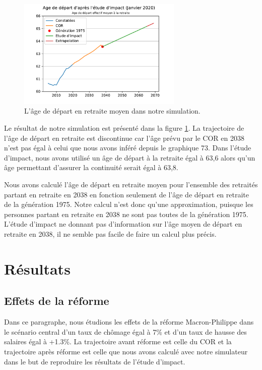 \documentclass[10pt]{article}
\begin{document}
\begin{figure}
\begin{center}
\includegraphics[width=0.7\textwidth]{Simulation-Age.pdf}
\end{center}
\caption{L'âge de départ en retraite moyen dans notre simulation.}
\label{fig-simulation-A}
\end{figure}

Le résultat de notre simulation est présenté dans la figure \ref{fig-simulation-A}. 
La trajectoire de l'âge de départ en retraite est discontinue car l'âge prévu par le COR en 2038 n'est pas égal à celui que nous avons inféré depuis le graphique 73. Dans l'étude d'impact, nous avons utilisé un âge de départ à la retraite égal à 63,6 alors qu'un âge permettant d'assurer la continuité serait égal à 63,8.

Nous avons calculé l'âge de départ en retraite moyen pour l'ensemble des retraités partant en retraite en 2038 en fonction seulement de l'âge de départ en retraite de la génération 1975. Notre calcul n'est donc qu'une approximation, puisque les personnes partant en retraite en 2038 ne sont pas toutes de la génération 1975. L'étude d'impact ne donnant pas d'information sur l'âge moyen de départ en retraite en 2038, il ne semble pas facile de faire un calcul plus précis. 


\section{Résultats}

\subsection{Effets de la réforme}

Dans ce paragraphe, nous étudions les effets de la réforme Macron-Philippe dans 
le scénario central d'un taux de chômage égal à 7\% 
et d'un taux de hausse des salaires égal à +1.3\%. 
La trajectoire avant réforme est celle du COR et la trajectoire après réforme est celle 
que nous avons calculé avec notre simulateur dans le but de reproduire les 
résultats de l'étude d'impact. 
\end{document}
